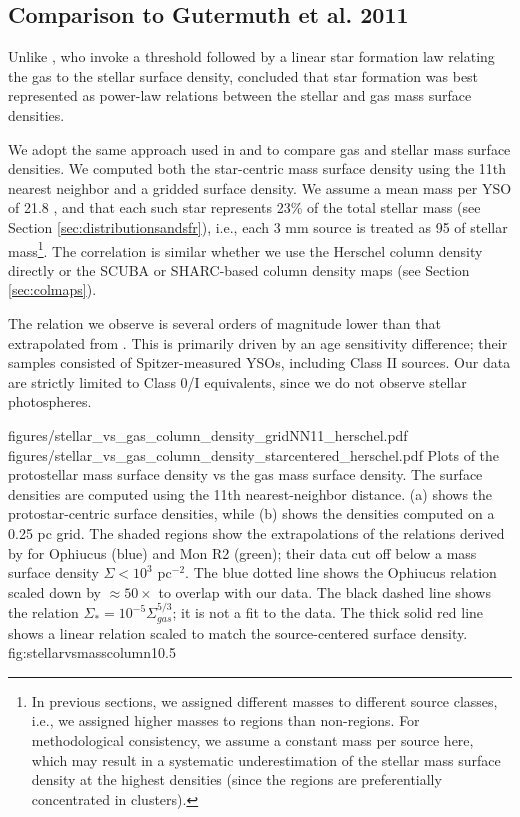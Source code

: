 \documentclass[twocolumn]{aastex61}
\begin{document}
\subsection{Comparison to Gutermuth et al. 2011}
Unlike \citet{Lada2010a}, who invoke a threshold followed by a linear star
formation law relating the gas to the stellar surface density,
\citet{Gutermuth2011a} concluded that star formation was best represented as
power-law relations between the stellar and gas mass surface densities.

We adopt the same approach used in \citet{Gutermuth2009a} and
\citet{Gutermuth2011a} to compare gas and stellar mass surface densities.  We
computed both the star-centric mass surface density using the 11th nearest
neighbor and a gridded surface density.  We assume a mean mass per YSO of 21.8
\msun, and that each such star represents 23\% of the total stellar mass (see
Section \ref{sec:distributionsandsfr}), i.e., each 3 mm source is treated as 95
\msun of stellar mass\footnote{In previous sections, we assigned different
masses to different source classes, i.e., we assigned higher masses to \hii regions
than non-\hii regions.  For methodological consistency, we assume a constant mass
per source here, which may result in a systematic underestimation of 
the stellar mass surface density at the highest densities (since the \hii regions
are preferentially concentrated in clusters).}. The correlation is similar whether we use the Herschel
column density directly or the SCUBA or SHARC-based column density maps (see
Section \ref{sec:colmaps}).  

The relation we observe is several orders of magnitude lower than that
extrapolated from \citet{Gutermuth2011a}.  This is primarily driven by an age
sensitivity difference; their samples consisted of Spitzer-measured YSOs,
including Class II sources.  Our data are strictly limited to Class 0/I
equivalents, since we do not observe stellar photospheres.

\FigureTwo
{figures/stellar_vs_gas_column_density_gridNN11_herschel.pdf}
{figures/stellar_vs_gas_column_density_starcentered_herschel.pdf}
{Plots of the protostellar mass surface density vs the gas mass surface
density.  The surface densities are computed using the 11th nearest-neighbor
distance.  (a) shows the protostar-centric surface densities, while (b) shows
the densities computed on a 0.25 pc grid.  The shaded regions
show the extrapolations of the relations derived by \citet{Gutermuth2011a}
for Ophiucus (blue) and Mon R2 (green); their data cut off below a mass
surface density $\Sigma < 10^3$ \msun pc$^{-2}$. 
The blue dotted line shows the Ophiucus relation scaled down by
$\approx50\times$ to overlap with our data.
The black dashed line shows the relation $\Sigma_* = 10^{-5}
\Sigma_{gas}^{5/3}$; it is not a fit to the data.
The thick solid red line shows a linear relation scaled
to match the source-centered surface density.}
{fig:stellarvsmasscolumn}{1}{0.5\textwidth}
\end{document}
